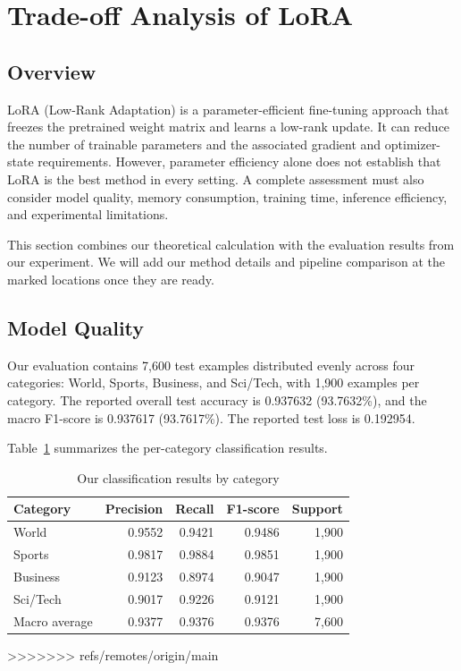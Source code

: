 \section{Trade-off Analysis of LoRA}

\subsection{Overview}

LoRA (Low-Rank Adaptation) is a parameter-efficient fine-tuning
approach that freezes the pretrained weight matrix and learns a
low-rank update. It can reduce the number of trainable parameters
and the associated gradient and optimizer-state requirements.
However, parameter efficiency alone does not establish that LoRA
is the best method in every setting. A complete assessment must
also consider model quality, memory consumption, training time,
inference efficiency, and experimental limitations.

This section combines our theoretical calculation with the
evaluation results from our experiment. We will add our method
details and pipeline comparison at the marked locations once they
are ready.

\subsection{Model Quality}

Our evaluation contains 7,600 test examples distributed
evenly across four categories: World, Sports, Business, and
Sci/Tech, with 1,900 examples per category. The reported overall
test accuracy is 0.937632 (93.7632\%), and the macro F1-score is
0.937617 (93.7617\%). The reported test loss is 0.192954.

Table~\ref{tab:classification} summarizes the per-category
classification results.

\begin{table}[htbp]
	\centering
	\caption{Our classification results by category}
	\label{tab:classification}
	\begin{tabular}{lrrrr}
		\hline
		Category      & Precision & Recall & F1-score & Support \\
		\hline
		World         & 0.9552    & 0.9421 & 0.9486   & 1,900   \\
		Sports        & 0.9817    & 0.9884 & 0.9851   & 1,900   \\
		Business      & 0.9123    & 0.8974 & 0.9047   & 1,900   \\
		Sci/Tech      & 0.9017    & 0.9226 & 0.9121   & 1,900   \\
		\hline
		Macro average & 0.9377    & 0.9376 & 0.9376   & 7,600   \\
		\hline
	\end{tabular}
	>>>>>>> refs/remotes/origin/main
\end{table}

